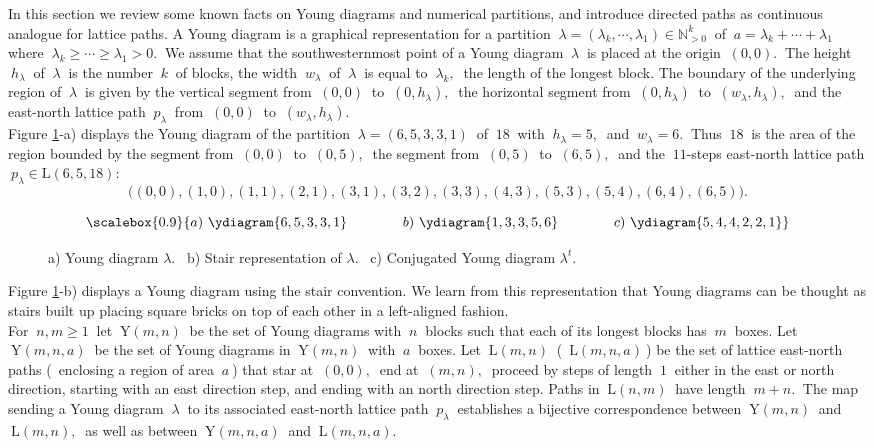 \documentclass[10pt,leqeq]{article}
\begin{document}
In this section we review some known facts on Young diagrams and numerical partitions, and introduce directed paths as continuous analogue for lattice paths. A Young diagram is a graphical representation for a partition $\ \lambda=(\lambda_{k},\cdots, \lambda_1)\in \mathbb{N}_{>0}^{k}\ $ of 
$\ a=\lambda_{k}+ \cdots + \lambda_1 \ $ where 
$\ \lambda_{k} \geq \cdots \geq \lambda_1 > 0. \ $ 
We assume that the southwesternmost point of a Young diagram $\ \lambda \ $ is placed at
the origin $ \ (0,0). \ $ The height $\ h_{\lambda}\ $ of  $\ \lambda \ $ is the number $ \ k\ $ of blocks, the width $\ w_{\lambda}\ $ of  $\ \lambda \ $ is equal to  $\ \lambda_{k}, \ $ the length of the longest block. The boundary of the underlying region of $\ \lambda \ $ is given by the vertical segment from $\ (0,0) \ $ to $\ (0,h_{\lambda}), \ $ the horizontal segment from $\ (0,h_{\lambda}) \ $ to
$\ (w_{\lambda}, h_{\lambda}), \ $ and the east-north lattice path $\ p_{\lambda}\ $ from $\ (0,0) \ $ to $\ (w_{\lambda}, h_{\lambda}). \ $ \\


Figure \ref{fig:yd}-a)  displays the Young diagram of the partition 
$\ \lambda=(6,5,3,3,1)\ $ of $\ 18 \ $ with $\ h_{\lambda}=5,\ $ and $\ w_{\lambda}=6.\ $   Thus $\ 18 \ $ is the area of the region bounded by
the segment  from $\ (0,0) \ $ to $\ (0,5), \ $ 
the segment from $\ (0,5) \ $ to
$\ (6, 5), \ $ and the $\ 11  $-steps east-north lattice path $\ p_{\lambda} \in \mathrm{L}(6,5,18):$
$$\big((0,0),(1,0),(1,1),(2,1),(3,1), (3,2),(3,3),(4,3),(5,3),(5,4),(6,4),(6,5)\big).$$
 
\begin{figure}
  $$\scalebox{0.9}{a) \ \ydiagram{6,5,3,3,1}\ \ \ \ \ \ \ \ \ \ \ \
 b) \ \ydiagram{1,3,3,5,6}
\ \ \ \ \ \ \ \ \ \ \ \    c) \ \ydiagram{5,4,4,2,2,1}}$$
  \caption{a) Young diagram $\lambda.$ \  b) Stair representation of  $\lambda.$  \ c) Conjugated Young diagram $\lambda^t.$ }
  \label{fig:yd}
\end{figure}
\noindent Figure \ref{fig:yd}-b) displays a Young diagram using the stair convention. We learn from this representation that Young diagrams can be thought as stairs built up placing square bricks on top of each other in a left-aligned fashion.\\


For $\ n,m \geq 1 \ $ let $\ \mathrm{Y}(m,n) \ $ be the set of Young diagrams with $\ n\ $ blocks such that each of its longest blocks has  $\ m \ $ boxes. Let $\ \mathrm{Y}(m,n,a)\ $ be the set of Young diagrams in $\ \mathrm{Y}(m,n) \ $ with  $\ a\ $ boxes. Let  
$\ \mathrm{L}(m,n) \ $ (\  $\mathrm{L}(m,n,a) \ $) be the set of lattice east-north paths  (\ enclosing a region of area $\ a\ $)  that  star at $\ (0,0),\ $ end at $\ (m,n),\ $ proceed by  steps of length $\ 1 \ $ either in the east or north direction, starting with an east direction step, and ending with an north direction step. Paths in  $\ \mathrm{L}(n,m) \ $ have length $\ m+n.\ $ The map sending a Young diagram $\ \lambda \ $ to its associated east-north lattice path $\ p_{\lambda} \ $ establishes a bijective correspondence between $\ \mathrm{Y}(m,n) \ $ and $\ \mathrm{L}(m,n), \ $ as well as between $\ \mathrm{Y}(m,n,a) \ $ and $\ \mathrm{L}(m,n,a).$ \\
\end{document}
